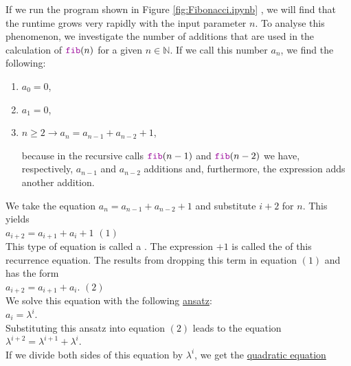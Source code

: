 If we run the program shown in Figure \ref{fig:Fibonacci.ipynb} , we will find that the runtime grows very rapidly with
the input parameter $n$.  To analyse this phenomenon, we investigate the number of additions that are used in the
calculation of $\mytt{fib}(n)$ for a given $n \in \mathbb{N}$.  If we call this number $a_n$, we find
the following:
\begin{enumerate}
\item $a_0 = 0$,
\item $a_1 = 0$,
\item $n \geq 2 \rightarrow a_n = a_{n-1} + a_{n-2} + 1$,

      because in the recursive calls $\mytt{fib}(n-1)$ and $\mytt{fib}(n-2)$ we have, respectively, 
      $a_{n-1}$ and $a_{n-2}$ additions and, furthermore, the expression
       adds another addition.
\end{enumerate}
We take the equation $a_n = a_{n-1} + a_{n-2} + 1$ and substitute $i+2$ for $n$.  This yields
\\[0.2cm]
\hspace*{1.3cm} $a_{i+2} = a_{i+1} + a_i + 1$ \hspace*{\fill} $(1)$
\\[0.2cm]
This type of equation is called a .  The expression $+ 1$ is
called the  of this recurrence equation.
The  
results from dropping this term in equation $(1)$ and has the form
\\[0.2cm]
\hspace*{1.3cm}
$a_{i+2} = a_{i+1} + a_i$. \hspace*{\fill} $(2)$
\\[0.2cm]
We solve this equation with the following \href{https://en.oxforddictionaries.com/definition/ansatz}{ansatz}:
\\[0.2cm]
\hspace*{1.3cm} $a_i = \lambda^i$. \\[0.2cm]
Substituting this ansatz into equation $(2)$ leads to the equation 
\\[0.2cm]
\hspace*{1.3cm}
$\lambda^{i+2} = \lambda^{i+1} + \lambda^i$.
\\[0.2cm]
If we divide both sides of this equation by $\lambda^i$, we get the
\href{https://en.wikipedia.org/wiki/Quadratic_equation}{quadratic equation}
